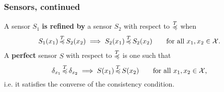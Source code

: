 \documentclass{beamer}
\def\ang#1{\left\langle#1\right\rangle}
\def\X{\mathcal{X}}
\def\Y{\mathcal{Y}}
\def\U{\mathcal{U}}
\def\less#1{\overset{#1}{\rule{0pt}{4pt}\smash{\preccurlyeq}}}
\begin{document}

\begin{frame}
\frametitle{Sensors, continued}
\begin{definition}
 A sensor $S_1$ \textbf{is refined by} a sensor $S_2$ with respect to $\less{T}$ when
 $$S_1(x_1)\,\less{T}\,S_2(x_2) \implies S_2(x_1)\,\less{T}\,S_2(x_2)\qquad\text{for all $x_1, x_2\in\X$.}$$
 A \textbf{perfect} sensor $S$ with respect to $\less{T}$ is one such that
 $$\delta_{x_1}\,\less{T}\,\delta_{x_2} \implies S(x_1)\,\less{T}\,S(x_2)\qquad\text{for all $x_1, x_2\in\X$,}$$
 i.e. it satisfies the converse of the consistency condition.
\end{definition}
\end{frame}

\iffalse
\begin{frame}
\frametitle{POMDP tasks}
$\ang{\X, \U, \Y, \D, \Omega}$
S is a set of states,
A is a set of actions,
O is a set of observations,
T is a set of conditional transition probabilities,
\Omega is a set of conditional observation probabilities,
R: A \times S \to \mathbb{R} is the reward function.
\end{frame}
\fi
\end{document}
